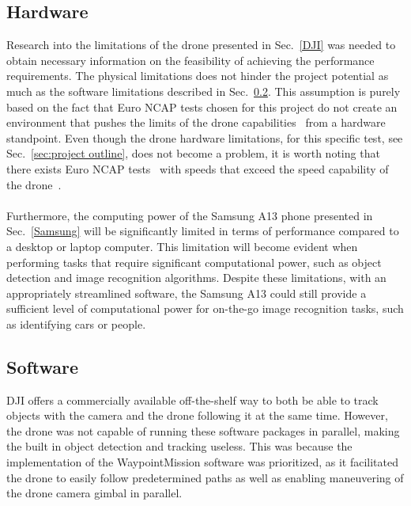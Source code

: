 \subsection{Hardware} \label{Drone limitations}
Research into the limitations of the drone presented in Sec.~\ref{DJI} was needed to obtain necessary information on the feasibility of achieving the performance requirements. The physical limitations does not hinder the project potential as much as the software limitations described in Sec.~\ref{limits of dji sdk}. This assumption is purely based on the fact that Euro NCAP tests chosen for this project do not create an environment that pushes the limits of the drone capabilities~\cite{DJI2021MAVICMANUAL} from a hardware standpoint. Even though the drone hardware limitations, for this specific test, see Sec.~\ref{sec:project outline}, does not become a problem, it is worth noting that there exists Euro NCAP tests~\cite{speed_euro_ncap} with speeds that exceed the speed capability of the drone~\cite{DJI2021MAVICMANUAL}.
\\ \\
Furthermore, the computing power of the Samsung A13 phone presented in Sec.~\ref{Samsung} will be significantly limited in terms of performance compared to a desktop or laptop computer. This limitation will become evident when performing tasks that require significant computational power, such as object detection and image recognition algorithms. Despite these limitations, with an appropriately streamlined software, the Samsung A13 could still provide a sufficient level of computational power for on-the-go image recognition tasks, such as identifying cars or people.


\subsection{Software} \label{limits of dji sdk}
DJI offers a commercially available off-the-shelf way to both be able to track objects with the camera and the drone following it at the same time. However, the drone was not capable of running these software packages in parallel, making the built in object detection and tracking useless. This was because the implementation of the WaypointMission software was prioritized, as it facilitated the drone to easily follow predetermined paths as well as enabling maneuvering of the drone camera gimbal in parallel.  
\newline
\label{sec:limit_WP}

